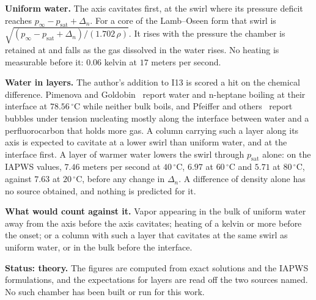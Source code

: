 \textbf{Uniform water.} The axis cavitates first, at the swirl where its pressure deficit reaches
$p_\infty - p_{\mathrm{sat}} + \Delta_n$. For a core of the Lamb--Oseen form that swirl is
$\sqrt{(p_\infty - p_{\mathrm{sat}} + \Delta_n)/(1.702\,\rho)}$. It rises with the pressure the
chamber is retained at and falls as the gas dissolved in the water rises. No heating is measurable
before it: $0.06$ kelvin at $17$ meters per second.

\textbf{Water in layers.} The author's addition to I13 is scored a hit on the chemical difference.
Pimenova and Goldobin~\cite{src:Pimenova-and-Goldobin-2014} report water and n-heptane boiling at
their interface at $78.56\,^\circ$C while neither bulk boils, and Pfeiffer and
others~\cite{src:Pfeiffer-et-al-2023} report bubbles under tension nucleating mostly along the
interface between water and a perfluorocarbon that holds more gas. A column carrying such a layer
along its axis is expected to cavitate at a lower swirl than uniform water, and at the interface
first. A layer of warmer water lowers the swirl through $p_{\mathrm{sat}}$ alone: on the IAPWS
values, $7.46$ meters per second at $40\,^\circ$C, $6.97$ at $60\,^\circ$C and $5.71$ at
$80\,^\circ$C, against $7.63$ at $20\,^\circ$C, before any change in $\Delta_n$. A difference
of density alone has no source obtained, and nothing is predicted for it.

\textbf{What would count against it.} Vapor appearing in the bulk of uniform water away from the
axis before the axis cavitates; heating of a kelvin or more before the onset; or a column with such a layer
that cavitates at the same swirl as uniform water, or in the bulk before the interface.

\textbf{Status: theory.} The figures are computed from exact solutions and the IAPWS formulations,
and the expectations for layers are read off the two sources named. No such chamber has been
built or run for this work.
